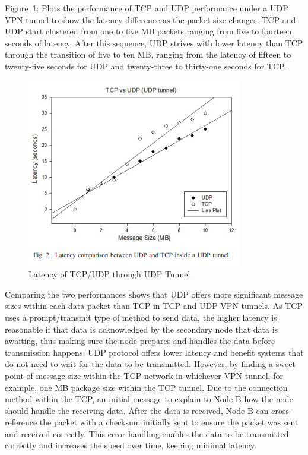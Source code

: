 \documentclass[conference]{IEEEtran}
\begin{document}
      Figure~\ref{fig:tcpudp-udptun}: Plots the performance of TCP and UDP performance under a UDP VPN tunnel to show the latency difference as the packet size changes. TCP and UDP start clustered from one to five MB packets ranging from five to fourteen seconds of latency. After this sequence, UDP strives with lower latency than TCP through the transition of five to ten MB, ranging from the latency of fifteen to twenty-five seconds for UDP and twenty-three to thirty-one seconds for TCP.
      \begin{figure}[h]
        \centering
        \includegraphics[width=0.70\columnwidth]{Figures/TCPUDP-UDPTUN.png}
        \caption{Latency of TCP/UDP through UDP Tunnel~\cite{coonjah_experimental_2015}}
        \label{fig:tcpudp-udptun}
      \end{figure}

      Comparing the two performances shows that UDP offers more significant message sizes within each data packet than TCP in TCP and UDP VPN tunnels. As TCP uses a prompt/transmit type of method to send data, the higher latency is reasonable if that data is acknowledged by the secondary node that data is awaiting, thus making sure the node prepares and handles the data before transmission happens. UDP protocol offers lower latency and benefit systems that do not need to wait for the data to be transmitted. However, by finding a sweet point of message size within the TCP network in whichever VPN tunnel, for example, one MB package size within the TCP tunnel. Due to the connection method within the TCP, an initial message to explain to Node B how the node should handle the receiving data. After the data is received, Node B can cross-reference the packet with a checksum initially sent to ensure the packet was sent and received correctly. This error handling enables the data to be transmitted correctly and increases the speed over time, keeping minimal latency.
\end{document}
